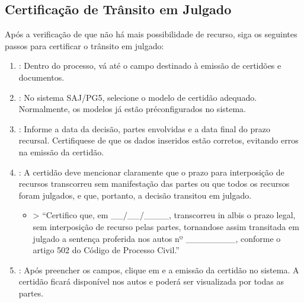 \documentclass[letterpaper,10pt,brazil]{sphinxmanual}
\begin{document}
\subsection{Certificação de Trânsito em Julgado}
\label{\detokenize{09certificartransito:certificacao-de-transito-em-julgado}}
\sphinxAtStartPar
Após a verificação de que não há mais possibilidade de recurso, siga os seguintes passos para certificar o trânsito em julgado:
\begin{enumerate}
%
\item {} 
\sphinxAtStartPar
{}: Dentro do processo, vá até o campo destinado à emissão de certidões e documentos.

\item {} 
\sphinxAtStartPar
{}: No sistema SAJ/PG5, selecione o modelo de certidão adequado. Normalmente, os modelos já estão pré\sphinxhyphen{}configurados no sistema.

\item {} 
\sphinxAtStartPar
{}: Informe a data da decisão, partes envolvidas e a data final do prazo recursal. Certifique\sphinxhyphen{}se de que os dados inseridos estão corretos, evitando erros na emissão da certidão.

\item {} 
\sphinxAtStartPar
{}: A certidão deve mencionar claramente que o prazo para interposição de recursos transcorreu sem manifestação das partes ou que todos os recursos foram julgados, e que, portanto, a decisão transitou em julgado.
\begin{itemize}
\item {} 
\sphinxAtStartPar
{}
\textgreater{} “Certifico que, em \_\_/\_\_/\_\_\_\_, transcorreu in albis o prazo legal, sem interposição de recurso pelas partes, tornando\sphinxhyphen{}se assim transitada em julgado a sentença proferida nos autos nº \_\_\_\_\_\_\_\_, conforme o artigo 502 do Código de Processo Civil.”

\end{itemize}

\item {} 
\sphinxAtStartPar
{}: Após preencher os campos, clique em  e  a emissão da certidão no sistema. A certidão ficará disponível nos autos e poderá ser visualizada por todas as partes.

\end{enumerate}
\end{document}
